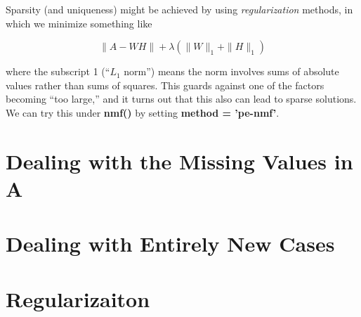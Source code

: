 Sparsity (and uniqueness) might be achieved by using {\it
regularization} methods, in which we minimize something like

\begin{equation}
\|A - WH\| + \lambda (\|W\|_1 + \|H\|_1)
\end{equation}

where the subscript 1 (``$L_1$ norm'') means the norm involves sums of
absolute values rather than sums of squares.  This guards against one of
the factors becoming ``too large,'' and it turns out that this also can
lead to sparse solutions.  We can try this under {\bf nmf()}  by setting
{\bf method = 'pe-nmf'}.

\section{Dealing with the Missing Values in A}

\section{Dealing with Entirely New Cases}

\section{Regularizaiton}
